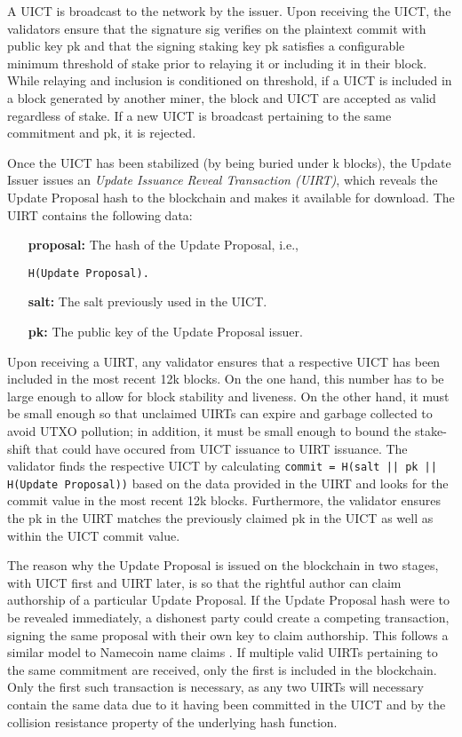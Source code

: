 A UICT is broadcast to the network by the issuer. Upon receiving the UICT, the validators ensure that the signature sig verifies on the plaintext commit with public key pk and that the signing staking key pk satisfies a configurable minimum threshold of stake prior to relaying it or including it in their block. While relaying and inclusion is conditioned on threshold, if a UICT is included in a block generated by another miner, the block and UICT are accepted as valid regardless of stake. If a new UICT is broadcast pertaining to the same commitment and pk, it is rejected.

Once the UICT has been stabilized (by being buried under k blocks), the Update Issuer issues an \emph{Update Issuance Reveal Transaction (UIRT)}, which reveals the Update Proposal hash to the blockchain and makes it available for download. The UIRT contains the following data:

\begin{itemize}
\item[\textbf{proposal:}] 
The hash of the Update Proposal, 
i.e., %
\begin{verbatim}
H(Update Proposal).
\end{verbatim}
\item[\textbf{salt:}] The salt previously used in the UICT.
\item[\textbf{pk:}] The public key of the Update Proposal issuer.
\end{itemize}

Upon receiving a UIRT, any validator ensures that a respective UICT has been included in the most recent 12k blocks. On the one hand, this number has to be large enough to allow for block stability and liveness. On the other hand, it must be small enough so that unclaimed UIRTs can expire and garbage collected to avoid UTXO pollution; in addition, it must be small enough to bound the stake-shift that could have occured from UICT issuance to UIRT issuance. The validator finds the respective UICT by calculating 
\verb;commit = H(salt || pk || H(Update Proposal));  based on the data provided in the UIRT and looks for the commit value in the most recent 12k blocks. Furthermore, the validator ensures the pk in the UIRT matches the previously claimed pk in the UICT as well as within the UICT commit value.

The reason why the Update Proposal is issued on the blockchain in two stages, with UICT first and UIRT later, is so that the rightful author can claim authorship of a particular Update Proposal. If the Update Proposal hash were to be revealed immediately, a dishonest party could create a competing transaction, signing the same proposal with their own key to claim authorship. This follows a similar model to Namecoin name claims \cite{Namecoin}. If multiple valid UIRTs pertaining to the same commitment are received, only the first is included in the blockchain. Only the first such transaction is necessary, as any two UIRTs will necessary contain the same data due to it having been committed in the UICT and by the collision resistance property of the underlying hash function.

